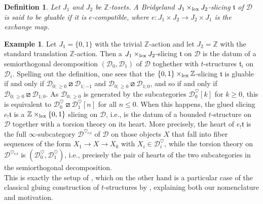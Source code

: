 \documentclass{article}
\newtheorem{defn}[thm]{Definition}
\theoremstyle{definition}
\newtheorem{exmp}[thm]{Example}
\newcommand{\Z}{\mathbb{Z}}
\newcommand{\tee}{\mathfrak{t}}
\newcommand{\orth}{\boxslash}
\newcommand{\lex}{\times_{\textnormal{lex}}}
\begin{document}
\begin{defn}\label{gluable}
Let $J_1$ and $J_2$ be $\Z$-tosets. A Bridgeland $J_1 \lex J_2$-slicing $\tee$ of $\mathscr{D}$ is said to be \emph{gluable} if it is $e$-compatible, where $e \colon J_1 \times J_2 \to J_2 \times J_1$ is the exchange map. 
\end{defn}

\begin{exmp}\label{example:bbd} Let $J_1=\{0,1\}$ with the trivial $\Z$-action and let $J_2=\Z$ with the standard translation $\Z$-action.  Then a $J_1\lex J_2$-slicing $\tee$ on $\mathscr{D}$ is the datum of a semiorthogonal decomposition $(\mathscr{D}_0,\mathscr{D}_1)$ of $\mathscr{D}$ toghether with $t$-structures $\tee_i$ on $\mathscr{D}_i$. Spelling out the definition, one sees that the $\{0,1\}\lex \Z$-slicing $\tee$ is gluable if and only if 
$\mathscr{D}_{0;\geq 0}\orth \mathscr{D}_{1;-1}$ and $\mathscr{D}_{0;\geq 0}\orth \mathscr{D}_{1;0}$, and so if and only if $\mathscr{D}_{0;\geq 0}\orth \mathscr{D}_{1;0}$. {\color{red}As  $\mathscr{D}_{0;\geq 0}$ is generated by the subcategories $\mathscr{D}_{0}^\heartsuit[k]$ for $k\geq 0$, this is equivalent to $\mathscr{D}_{0}^\heartsuit\orth\mathscr{D}_{1}^\heartsuit[n]$ for all $n\leq 0$.} When this happens, the glued slicing $e_!\tee$ is a $\Z\lex\{0,1\}$ slicing on $\mathscr{D}$, i.e., is the datum of a bounded $t$-structure on $\mathscr{D}$ together with a torsion theory on its heart. More precisely, the heart of $e_!\tee$ is the full $\infty$-subcategory $\mathscr{D}^{\heartsuit_{e_!\tee}}$ of $\mathscr{D}$ on those objects $X$ that fall into fiber sequences of the form $X_1\to X\to X_0$ with $X_i\in \mathscr{D}_i^\heartsuit$, while the torsion theory on $\mathscr{D}^{\heartsuit_{e_!\tee}}$ is
  $(\mathscr{D}_0^{\heartsuit},\mathscr{D}_1^{\heartsuit})$, i.e., precisely the pair of hearts of the two subcategories in the semiorthogonal decomposition. \\
  This is exactly the setup of \cite{collins}, which on the other hand is a particular case of the classical gluing construction of $t$-structures by \cite{bbd}, explaining both our nomenclature and motivation.
\end{exmp}
\end{document}
